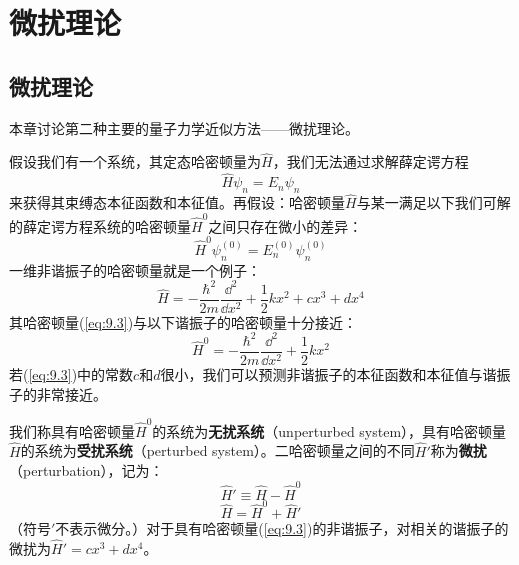 \chapter{微扰理论}
\label{chap:9}
\section{微扰理论}
\label{sec:9.1 Perturbation Theory}
    本章讨论第二种主要的量子力学近似方法——微扰理论。

    假设我们有一个系统，其定态哈密顿量为$\hat{H}$，我们无法通过求解薛定谔方程
    \begin{equation}
        \hat{H} \psi_n = E_n \psi_n
        \label{eq:9.1}
    \end{equation}
    来获得其束缚态本征函数和本征值。再假设：哈密顿量$\hat{H}$与某一满足以下我们可解的薛定谔方程系统的哈密顿量$\hat{H}^0$之间只存在微小的差异：
    \begin{equation}
        \hat{H}^0 \psi_n^{\left(0\right)} = E_n^{\left(0\right)} \psi_n^{\left(0\right)}
        \label{eq:9.2}
    \end{equation}
    一维非谐振子的哈密顿量就是一个例子：
    \begin{equation}
        \hat{H} = -\frac{\hbar^2}{2m} \frac{\dd ^2}{\dd x^2} + \frac{1}{2}kx^2 + cx^3 + dx^4
        \label{eq:9.3}
    \end{equation}
    其哈密顿量(\ref{eq:9.3})与以下谐振子的哈密顿量十分接近：
    \begin{equation}
        \hat{H}^0 = -\frac{\hbar^2}{2m} \frac{\dd ^2}{\dd x^2} + \frac{1}{2}kx^2
        \label{eq:9.4}
    \end{equation}
    若(\ref{eq:9.3})中的常数$c$和$d$很小，我们可以预测非谐振子的本征函数和本征值与谐振子的非常接近。

    我们称具有哈密顿量$\hat{H}^0$的系统为\textbf{无扰系统}（unperturbed system），具有哈密顿量$\hat{H}$的系统为\textbf{受扰系统}（perturbed system）。二哈密顿量之间的不同$\hat{H}'$称为\textbf{微扰}（perturbation），记为：
    \begin{equation}
        \hat{H}' \equiv \hat{H} - \hat{H}^0
        \label{eq:9.5}
    \end{equation}
    \begin{equation}
        \boxed{
        \hat{H} = \hat{H}^0 + \hat{H}'
        }
        \label{eq:9.6}
    \end{equation}
    （符号$\prime$不表示微分。）对于具有哈密顿量(\ref{eq:9.3})的非谐振子，对相关的谐振子的微扰为$\hat{H}' = cx^3 + dx^4$。


